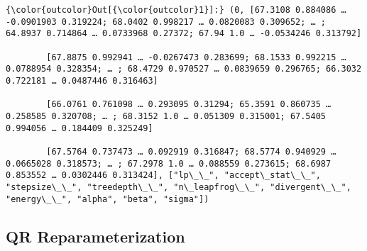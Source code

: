 \documentclass[11pt]{article}
\begin{document}
\begin{Verbatim}[commandchars=\\\{\}]
{\color{outcolor}Out[{\color{outcolor}1}]:} (0, [67.3108 0.884086 … -0.0901903 0.319224; 68.0402 0.998217 … 0.0820083 0.309652; … ; 64.8937 0.714864 … 0.0733968 0.27372; 67.94 1.0 … -0.0534246 0.313792]
        
        [67.8875 0.992941 … -0.0267473 0.283699; 68.1533 0.992215 … 0.0788954 0.328354; … ; 68.4729 0.970527 … 0.0839659 0.296765; 66.3032 0.722181 … 0.0487446 0.316463]
        
        [66.0761 0.761098 … 0.293095 0.31294; 65.3591 0.860735 … 0.258585 0.320708; … ; 68.3152 1.0 … 0.051309 0.315001; 67.5405 0.994056 … 0.184409 0.325249]
        
        [67.5764 0.737473 … 0.092919 0.316847; 68.5774 0.940929 … 0.0665028 0.318573; … ; 67.2978 1.0 … 0.088559 0.273615; 68.6987 0.853552 … 0.0302446 0.313424], ["lp\_\_", "accept\_stat\_\_", "stepsize\_\_", "treedepth\_\_", "n\_leapfrog\_\_", "divergent\_\_", "energy\_\_", "alpha", "beta", "sigma"])
\end{Verbatim}
            
    \hypertarget{qr-reparameterization}{%
\subsection{QR Reparameterization}\label{qr-reparameterization}}
\end{document}
